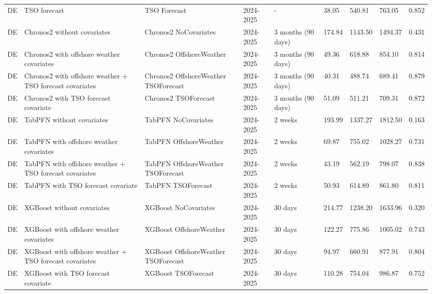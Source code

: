 \begin{longtable}{lllllllll}
DE & TSO forecast & TSO Forecast & 2024-2025 & - & 38.05 & 540.81 & 763.05 & 0.852 \\
DE & Chronos2 without covariates & Chronos2 NoCovariates & 2024-2025 & 3 months (90 days) & 174.84 & 1143.50 & 1494.37 & 0.431 \\
DE & Chronos2 with offshore weather covariates & Chronos2 OffshoreWeather & 2024-2025 & 3 months (90 days) & 49.36 & 618.88 & 854.10 & 0.814 \\
DE & Chronos2 with offshore weather + TSO forecast covariates & Chronos2 OffshoreWeather TSOForecast & 2024-2025 & 3 months (90 days) & 40.31 & 488.74 & 689.41 & 0.879 \\
DE & Chronos2 with TSO forecast covariate & Chronos2 TSOForecast & 2024-2025 & 3 months (90 days) & 51.09 & 511.21 & 709.31 & 0.872 \\
DE & TabPFN without covariates & TabPFN NoCovariates & 2024-2025 & 2 weeks & 193.99 & 1337.27 & 1812.50 & 0.163 \\
DE & TabPFN with offshore weather covariates & TabPFN OffshoreWeather & 2024-2025 & 2 weeks & 69.87 & 755.02 & 1028.27 & 0.731 \\
DE & TabPFN with offshore weather + TSO forecast covariates & TabPFN OffshoreWeather TSOForecast & 2024-2025 & 2 weeks & 43.19 & 562.19 & 798.07 & 0.838 \\
DE & TabPFN with TSO forecast covariate & TabPFN TSOForecast & 2024-2025 & 2 weeks & 50.93 & 614.89 & 861.80 & 0.811 \\
DE & XGBoost without covariates & XGBoost NoCovariates & 2024-2025 & 30 days & 214.77 & 1238.20 & 1633.96 & 0.320 \\
DE & XGBoost with offshore weather covariates & XGBoost OffshoreWeather & 2024-2025 & 30 days & 122.27 & 775.86 & 1005.02 & 0.743 \\
DE & XGBoost with offshore weather + TSO forecast covariates & XGBoost OffshoreWeather TSOForecast & 2024-2025 & 30 days & 94.97 & 660.91 & 877.91 & 0.804 \\
DE & XGBoost with TSO forecast covariate & XGBoost TSOForecast & 2024-2025 & 30 days & 110.28 & 754.04 & 986.87 & 0.752 \\
\end{longtable}
